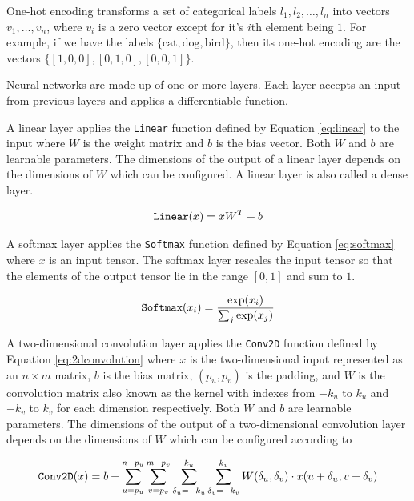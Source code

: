 One-hot encoding transforms a set of categorical labels $l_1, l_2, \ldots, l_{n}$ into vectors $v_1, \ldots, v_{n}$, where $v_i$ is a zero vector except for it's $i$th element being $1$. For example, if we have the labels $\{\text{cat}, \text{dog}, \text{bird}\}$, then its one-hot encoding are the vectors $\{[1,0,0], [0, 1, 0], [0, 0, 1]\}$.

Neural networks are made up of one or more layers. Each layer accepts an input from previous layers and applies a differentiable function.

A linear layer applies the \verb|Linear| function defined by Equation \ref{eq:linear} to the input where $W$ is the weight matrix and $b$ is the bias vector. Both $W$ and $b$ are learnable parameters. The dimensions of the output of a linear layer depends on the dimensions of $W$ which can be configured. A linear layer is also called a dense layer.

\begin{equation}
    \verb|Linear|(x) = xW^T + b
    \label{eq:linear}
\end{equation}

A softmax layer applies the \verb|Softmax| function defined by Equation \ref{eq:softmax} where $x$ is an input tensor. The softmax layer rescales the input tensor so that the elements of the output tensor lie in the range $[0, 1]$ and sum to $1$.

\begin{equation}
    \verb|Softmax|(x_i) = \frac{\exp(x_i)}{\sum_j \exp(x_j)}
    \label{eq:softmax}
\end{equation}


A two-dimensional convolution layer applies the \verb|Conv2D| function defined by Equation \ref{eq:2dconvolution} where $x$ is the two-dimensional input represented as an $n \times m$ matrix, $b$ is the bias matrix, $(p_u, p_v)$ is the padding, and $W$ is the convolution matrix also known as the kernel with indexes from $-k_u$ to $k_u$ and $-k_v$ to $k_v$ for each dimension respectively. Both $W$ and $b$ are learnable parameters. The dimensions of the output of a two-dimensional convolution layer depends on the dimensions of $W$ which can be configured according to \cite{DBLP:journals/corr/OSheaN15}

\begin{equation}
    \verb|Conv2D|(x) = b + \sum_{u = p_u}^{n - p_u} \sum_{v = p_v}^{m - p_v} \sum_{\delta_u = -k_u}^{k_u} \sum_{\delta_v = -k_v}^{k_v} W(\delta_u, \delta_v) \cdot x(u + \delta_u, v + \delta_v)
    \label{eq:2dconvolution}
\end{equation}

